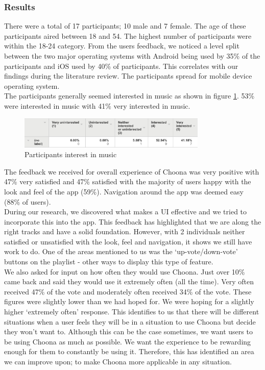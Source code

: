 \subsubsection{Results}
There were a total of 17 participants; 10 male and 7 female. The age of these participants aired between 18 and 54. The highest number of participants were within the 18-24 category.
From the users feedback, we noticed a level split between the two major operating systems with Android being used by 35\% of the participants and iOS used by 40\% of participants.  This correlates with our findings during the literature review.  The participants spread for mobile device operating system.  \\
The participants generally seemed interested in music as shown in figure \ref{fig:interest_music}.  53\% were interested in music with 41\% very interested in music.  \\

    \begin{figure}[h!]
      \centering
      \includegraphics[width=0.8\textwidth]{./img/music_interest.png}
      \caption{Participants interest in music}
      \label{fig:interest_music}
    \end{figure}

The feedback we received for overall experience of Choona was very positive with 47\% very satisfied and 47\% satisfied with the majority of users happy with the look and feel of the app (59\%).  Navigation around the app was deemed easy (88\% of users).  \\
During our research, we discovered what makes a UI effective and we tried to incorporate this into the app.  This feedback has highlighted that we are along the right tracks and have a solid foundation.  However, with 2 individuals neither satisfied or unsatisfied with the look, feel and navigation, it shows we still have work to do.  One of the areas mentioned to us was the `up-vote/down-vote' buttons on the playlist - other ways to display this type of feature.  \\

We also asked for input on how often they would use Choona.  Just over 10\% came back and said they would use it extremely often (all the time).  Very often received 47\% of the vote and moderately often received 34\% of the vote.  These figures were slightly lower than we had hoped for. We were hoping for a slightly higher `extremely often' response.  This identifies to us that there will be different situations when a user feels they will be in a situation to use Choona but decide they won't want to.  Although this can be the case sometimes, we want users to be using Choona as much as possible.  We want the experience to be rewarding enough for them to constantly be using it.  Therefore, this has identified an area we can improve upon; to make Choona more applicable in any situation.  \\

